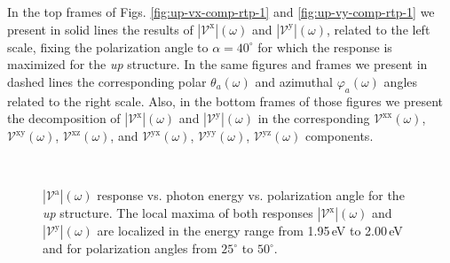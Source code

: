 \documentclass[prb,11pt,tightenlines,twocolumn,aps]{revtex4-1}
\begin{document}
In the top frames of  Figs. \ref{fig:up-vx-comp-rtp-1} and 
% 
\ref{fig:up-vy-comp-rtp-1} we present in solid lines the results of
$|\mathcal{V}^{\mathrm{x}}|(\omega)$ and $|\mathcal{V}^{\mathrm{y}}|(\omega)$,
related to the left scale, fixing the polarization angle to $\alpha=40^{\circ}$
for which the response is maximized for the \emph{up} structure. In the same
figures and frames we present in dashed lines the corresponding polar
$\theta_{a}(\omega)$ and azimuthal $\varphi_{a}(\omega)$ angles related to the
right scale. Also, in the bottom frames of those figures we present the
decomposition of $|\mathcal{V}^{\mathrm{x}}|(\omega)$ and
$|\mathcal{V}^{\mathrm{y}}|(\omega)$ in the corresponding
$\mathcal{V}^{\mathrm{xx}}(\omega)$, $\mathcal{V}^{\mathrm{xy}}(\omega)$,
$\mathcal{V}^{\mathrm{xz}}(\omega)$, and $\mathcal{V}^{\mathrm{yx}}(\omega)$,
$\mathcal{V}^{\mathrm{yy}}(\omega)$, $\mathcal{V}^{\mathrm{yz}}(\omega)$
components.
\begin{figure}[t]
    \centering
    \\
    
    \caption{$|\mathcal{V}^{\mathrm{a}}|(\omega)$ response vs. photon energy vs.
    polarization angle for the \emph{up} structure. The local maxima of both
    responses $|\mathcal{V}^{\mathrm{x}}|(\omega)$ and
    $|\mathcal{V}^{\mathrm{y}}|(\omega)$ are localized in the energy range from
    1.95\,eV to 2.00\,eV and for polarization angles from $25^{\circ}$ to
    $50^{\circ}$.}
    \label{fig:up-3d-vva-2}
\end{figure}
\end{document}
